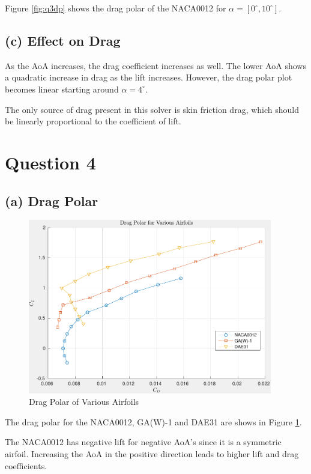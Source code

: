 \documentclass[letterpaper,12pt,]{article}
\begin{document}
Figure \ref{fig:q3dp} shows the drag polar of the NACA0012 for $\alpha = \left[0^\circ,10^\circ\right]$.

\subsection*{(c) Effect on Drag}

As the AoA increases, the drag coefficient increases as well.
The lower AoA shows a quadratic increase in drag as the lift increases.
However, the drag polar plot becomes linear starting around $\alpha = 4^\circ$.

The only source of drag present in this solver is skin friction drag, which should be linearly proportional to the coefficient of lift.

\section*{Question 4}

\subsection*{(a) Drag Polar}
\begin{figure}[!h]
    \centering
    \includegraphics[width = 0.95\textwidth]{./figures/q4dp.pdf}
    \caption{Drag Polar of Various Airfoils}
    \label{fig:q4a}
\end{figure}

The drag polar for the NACA0012, GA(W)-1 and DAE31 are shows in Figure \ref{fig:q4a}.

The NACA0012 has negative lift for negative AoA's since it is a symmetric airfoil. Increasing the AoA in the positive direction leads to higher lift and drag coefficients.
\end{document}
